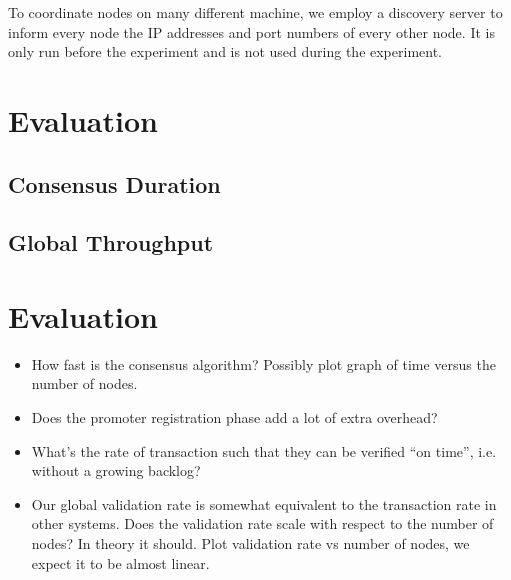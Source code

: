 To coordinate nodes on many different machine,
we employ a discovery server to inform every node the IP addresses and port numbers of every other node.
It is only run before the experiment and is not used during the experiment.


\section{Evaluation}
\label{sec:evaluation}

\subsection{Consensus Duration}

\subsection{Global Throughput}

\section{Evaluation}
\begin{itemize}
  \item How fast is the consensus algorithm? Possibly plot graph of time versus
    the number of nodes.
  \item Does the promoter registration phase add a lot of extra overhead?
  \item What's the rate of transaction such that they can be verified ``on
    time'', i.e. without a growing backlog?
  \item Our global validation rate is somewhat equivalent to the transaction
    rate in other systems. Does the validation rate scale with respect to the
    number of nodes? In theory it should. Plot validation rate vs number of
    nodes, we expect it to be almost linear.
\end{itemize}